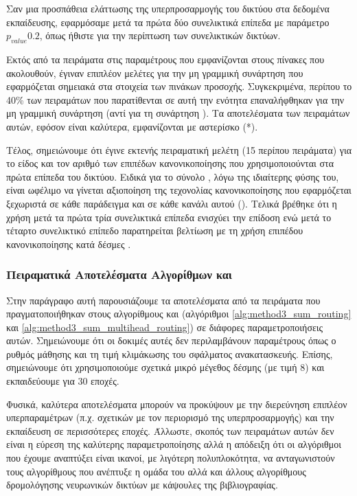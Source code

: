 Σαν μια προσπάθεια ελάττωσης της υπερπροσαρμογής του δικτύου στα δεδομένα εκπαίδευσης, εφαρμόσαμε μετά τα πρώτα δύο συνελικτικά επίπεδα με παράμετρο $p_{value} 0.2$, όπως ήθιστε για την περίπτωση των συνελικτικών δικτύων.\par

Εκτός από τα πειράματα στις παραμέτρους που εμφανίζονται στους πίνακες που ακολουθούν, έγιναν επιπλέον μελέτες για την μη γραμμική συνάρτηση που εφαρμόζεται σημειακά στα στοιχεία των πινάκων προσοχής. Συγκεκριμένα, περίπου το 40\% των πειραμάτων που παρατίθενται σε αυτή την ενότητα επαναλήφθηκαν για την μη γραμμική συνάρτηση  (αντί για τη συνάρτηση ). Τα αποτελέσματα των πειραμάτων αυτών, εφόσον είναι καλύτερα, εμφανίζονται με αστερίσκο (*).\par

Τέλος, σημειώνουμε ότι έγινε εκτενής πειραματική μελέτη (15 περίπου πειράματα) για το είδος και τον αριθμό των επιπέδων κανονικοποίησης που χρησιμοποιούνται στα πρώτα επίπεδα του δικτύου. Ειδικά για το σύνολο , λόγω της ιδιαίτερης φύσης του, είναι ωφέλιμο να γίνεται αξιοποίηση της τεχονολίας κανονικοποίησης που εφαρμόζεται ξεχωριστά σε κάθε παράδειγμα και σε κάθε κανάλι αυτού (). Τελικά βρέθηκε ότι η χρήση  μετά τα πρώτα τρία συνελικτικά επίπεδα ενισχύει την επίδοση ενώ μετά το τέταρτο συνελικτικό επίπεδο παρατηρείται βελτίωση με τη χρήση επιπέδου κανονικοποίησης κατά δέσμες .

\subsubsection{Πειραματικά Αποτελέσματα Αλγορίθμων  και }

Στην παράγραφο αυτή παρουσιάζουμε τα αποτελέσματα από τα πειράματα που πραγματοποιήθηκαν στους αλγορίθμους  και  (αλγόριθμοι \ref{alg:method3_sum_routing} και \ref{alg:method3_sum_multihead_routing}) σε διάφορες παραμετροποιήσεις αυτών. Σημειώνουμε ότι οι δοκιμές αυτές δεν περιλαμβάνουν παραμέτρους όπως ο ρυθμός μάθησης και τη τιμή κλιμάκωσης του σφάλματος ανακατασκευής. Επίσης, σημειώνουμε ότι χρησιμοποιούμε σχετικά μικρό μέγεθος δέσμης (με τιμή 8) και εκπαιδεύουμε για 30 εποχές.\par 

Φυσικά, καλύτερα αποτελέσματα μπορούν να προκύψουν με την διερεύνηση επιπλέον υπερπαραμέτρων (π.χ. σχετικών με τον περιορισμό της υπερπροσαρμογής) και την εκπαίδευση σε περισσότερες εποχές. Άλλωστε, σκοπός των πειραμάτων αυτών δεν είναι η εύρεση της καλύτερης παραμετροποίησης αλλά η απόδειξη ότι οι αλγόριθμοι που έχουμε αναπτύξει είναι ικανοί, με λιγότερη πολυπλοκότητα, να ανταγωνιστούν τους αλγορίθμους που ανέπτυξε η ομάδα του  αλλά και άλλους αλγορίθμους δρομολόγησης νευρωνικών δικτύων με κάψουλες της βιβλιογραφίας.\par

